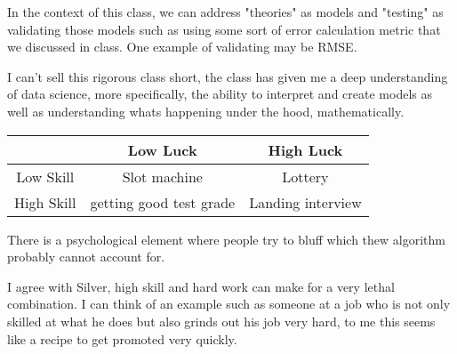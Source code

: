 \documentclass[12pt]{article}
\begin{document}
\begin{enumerate}



In the context of this class, we can address "theories" as models and "testing" as validating those models such as using some sort of error calculation metric that we discussed in class. One example of validating may be RMSE.


I can't sell this rigorous class short, the class has given me a deep understanding of data science, more specifically, the ability to interpret and create models as well as understanding whats happening under the hood, mathematically.


\begin{tabular}{|c|c|c|}
\hline
 & Low Luck & High Luck \\ \hline
Low Skill & Slot machine & Lottery \\ \hline
High Skill & getting good test grade & Landing interview \\ \hline
\end{tabular}


There is a psychological element where people try to bluff which thew algorithm probably cannot account for.


I agree with Silver, high skill and hard work can make for a very lethal combination. I can think of an example such as someone at a job who is not only skilled at what he does but also grinds out his job very hard, to me this seems like a recipe to get promoted very quickly.


\end{enumerate}
\end{document}

